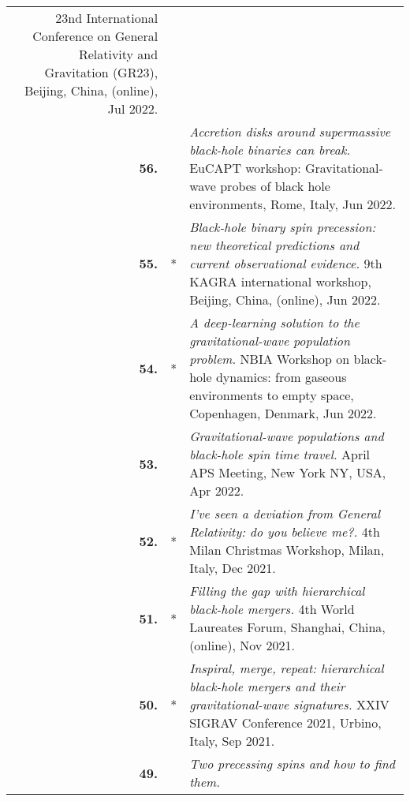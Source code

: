 {\begin{longtable}{rp{0.3cm}p{15.8cm}}
\newline{}
23nd International Conference on General Relativity and Gravitation (GR23), Beijing, China, (online), Jul 2022.
\vspace{0.05cm}\\
%
\textbf{56.} &  & \textit{Accretion disks around supermassive black-hole binaries can break.}
\newline{}
EuCAPT workshop: Gravitational-wave probes of black hole environments, Rome, Italy, Jun 2022.
\vspace{0.05cm}\\
%
\textbf{55.} & * & \textit{Black-hole binary spin precession: new theoretical predictions and current observational evidence.}
\newline{}
9th KAGRA international workshop, Beijing, China, (online), Jun 2022.
\vspace{0.05cm}\\
%
\textbf{54.} & * & \textit{A deep-learning solution to the gravitational-wave population problem.}
\newline{}
NBIA Workshop on black-hole dynamics: from gaseous environments to empty space, Copenhagen, Denmark, Jun 2022.
\vspace{0.05cm}\\
%
\textbf{53.} &  & \textit{Gravitational-wave populations and black-hole spin time travel.}
\newline{}
April APS Meeting, New York NY, USA, Apr 2022.
\vspace{0.05cm}\\
%
\textbf{52.} & * & \textit{I've seen a deviation from General Relativity: do you believe me?.}
\newline{}
4th Milan Christmas Workshop, Milan, Italy, Dec 2021.
\vspace{0.05cm}\\
%
\textbf{51.} & * & \textit{Filling the gap with hierarchical black-hole mergers.}
\newline{}
4th World Laureates Forum, Shanghai, China, (online), Nov 2021.
\vspace{0.05cm}\\
%
\textbf{50.} & * & \textit{Inspiral, merge, repeat: hierarchical black-hole mergers and their gravitational-wave signatures.}
\newline{}
XXIV SIGRAV Conference 2021, Urbino, Italy, Sep 2021.
\vspace{0.05cm}\\
%
\textbf{49.} &  & \textit{Two precessing spins and how to find them.}
\newline{}

\end{longtable}}
